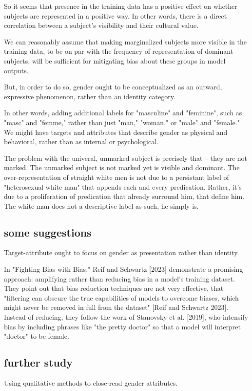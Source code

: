 \documentclass[11pt]{article}
\begin{document}
So it seems that presence in the training data has a positive effect
on whether subjects are represented in a positive way. In other words,
there is a direct correlation between a subject's visibility and their
cultural value.

We can reasonably assume that making marginalized subjects more
visible in the training data, to be on par with the frequency of
representation of dominant subjects, will be sufficient for mitigating
bias about these groups in model outputs.

But, in order to do so, gender ought to be conceptualized as an
outward, expressive phenomenon, rather than an identity category.

In other words, adding additional labels for "masculine" and
"feminine", such as "masc" and "femme," rather than just "man,"
"woman," or "male" and "female." We might have targets and attributes
that describe gender as physical and behavioral, rather than as
internal or psychological.

The problem with the univeral, unmarked subject is precisely that --
they are not marked. The unmarked subject is not marked yet is visible
and dominant. The over-representation of straight white men is not due
to a persistant label of "heterosexual white man" that appends each
and every predication. Rather, it's due to a proliferation of
predication that already surround him, that define him. The white man
does not a descriptive label as such, he simply is.

\subsection{some suggestions}
\label{sec:org3a9fbc0}
Target-attribute ought to focus on gender as presentation rather than
identity.

In "Fighting Bias with Bias," Reif and Schwartz [2023] demonstrate a
promising approach: amplifying rather than reducing bias in a model's
training dataset. They point out that bias reduction techniques are
not very effective, that "filtering can obscure the true capabilities
of models to overcome biases, which might never be removed in full
from the dataset" [Reif and Schwartz 2023]. Instead of reducing, they
follow the work of Stanovsky et al. [2019], who intensify bias by
including phrases like "the pretty doctor" so that a model will
interpret "doctor" to be female.

\subsection{further study}
\label{sec:org2f63235}
Using qualitative methods to close-read gender attributes. 
\end{document}
